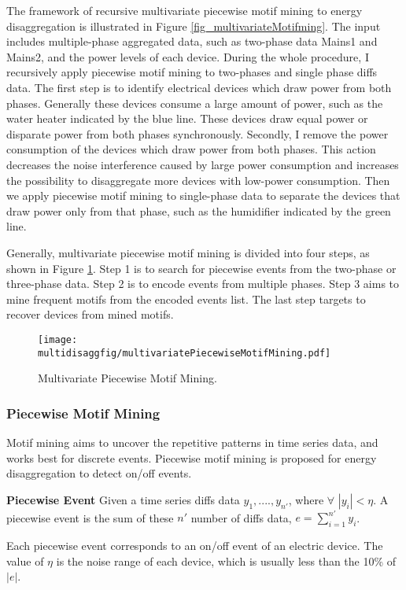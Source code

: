 The framework of recursive multivariate piecewise motif mining to energy disaggregation is illustrated in Figure \ref{fig_multivariateMotifming}. 
The input includes multiple-phase aggregated data, such as two-phase data Mains1 and Mains2, 
and the power levels of each device. 
During the whole procedure, I recursively apply piecewise motif mining to two-phases and single phase diffs data.
The first step is to identify electrical devices which draw power from both phases.
Generally these devices consume a large amount of power, such as the water heater indicated by the blue line.
These devices draw equal power or disparate power from both phases synchronously. 
Secondly, I remove the power consumption of the devices which draw power from both phases.
This action decreases the noise interference caused by large power consumption 
and increases the possibility to disaggregate more devices with low-power consumption. 
Then we apply piecewise motif mining to single-phase data to separate 
the devices that draw power only from that phase, 
such as the humidifier indicated by the green line. 

Generally, multivariate piecewise motif mining is divided into four steps, as shown in Figure \ref{fig_multivariatePiecewiseMotifMining}.
Step 1 is to search for piecewise events from the two-phase or three-phase data.
Step 2 is to encode events from multiple phases. 
Step 3 aims to mine frequent motifs from the encoded events list.
The last step targets to recover devices from mined motifs. 
\begin{figure}[h]
\centering
\texttt{[image: multidisaggfig/multivariatePiecewiseMotifMining.pdf]}
\caption{Multivariate Piecewise Motif Mining.}
\label{fig_multivariatePiecewiseMotifMining}
\end{figure}

\subsubsection{Piecewise Motif Mining}
Motif mining aims to uncover the repetitive patterns in time series data, and works best for discrete events. Piecewise motif mining is proposed 
for energy disaggregation to detect on/off events. 

\begin{definition}{\textbf{Piecewise Event}}
Given a time series diffs data $y_1, ...., y_{n'}$, where $\forall$ $|y_i| < \eta$. 
A piecewise event is the sum of these $n'$ number of diffs data, $e= \sum_{i=1}^{n'} y_i$. 
\end{definition}
Each piecewise event corresponds to an on/off event of an electric device. 
The value of $\eta$ is the noise range of each device, 
which is usually less than the 10\% of $|e|$.  

